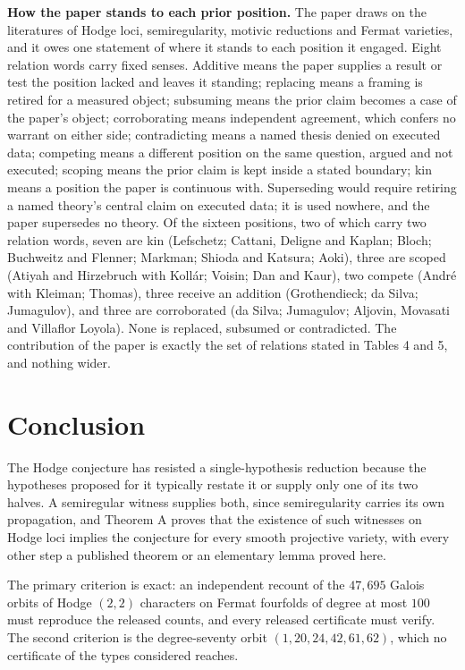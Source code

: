 \documentclass[10pt,twocolumn]{article}
\begin{document}
\textbf{How the paper stands to each prior position.} The paper draws on
the literatures of Hodge loci, semiregularity, motivic reductions and
Fermat varieties, and it owes one statement of where it stands to each
position it engaged. Eight relation words carry fixed senses. Additive
means the paper supplies a result or test the position lacked and leaves
it standing; replacing means a framing is retired for a measured object;
subsuming means the prior claim becomes a case of the paper's object;
corroborating means independent agreement, which confers no warrant on
either side; contradicting means a named thesis denied on executed data;
competing means a different position on the same question, argued and
not executed; scoping means the prior claim is kept inside a stated
boundary; kin means a position the paper is continuous with. Superseding
would require retiring a named theory's central claim on executed data;
it is used nowhere, and the paper supersedes no theory. Of the sixteen
positions, two of which carry two relation words, seven are kin
(Lefschetz; Cattani, Deligne and Kaplan; Bloch; Buchweitz and Flenner;
Markman; Shioda and Katsura; Aoki), three are scoped (Atiyah and
Hirzebruch with Kollár; Voisin; Dan and Kaur), two compete (André with
Kleiman; Thomas), three receive an addition (Grothendieck; da Silva;
Jumagulov), and three are corroborated (da Silva; Jumagulov; Aljovin,
Movasati and Villaflor Loyola). None is replaced, subsumed or
contradicted. The contribution of the paper is exactly the set of
relations stated in Tables 4 and 5, and nothing wider.

\hypertarget{conclusion}{%
\section{Conclusion}\label{conclusion}}

The Hodge conjecture has resisted a single-hypothesis reduction because
the hypotheses proposed for it typically restate it or supply only one
of its two halves. A semiregular witness supplies both, since
semiregularity carries its own propagation, and Theorem A proves that
the existence of such witnesses on Hodge loci implies the conjecture for
every smooth projective variety, with every other step a published
theorem or an elementary lemma proved here.

The primary criterion is exact: an independent recount of the
\(47{,}695\) Galois orbits of Hodge \((2,2)\) characters on Fermat
fourfolds of degree at most \(100\) must reproduce the released counts,
and every released certificate must verify. The second criterion is the
degree-seventy orbit \((1,20,24,42,61,62)\), which no certificate of the
types considered reaches.
\end{document}
